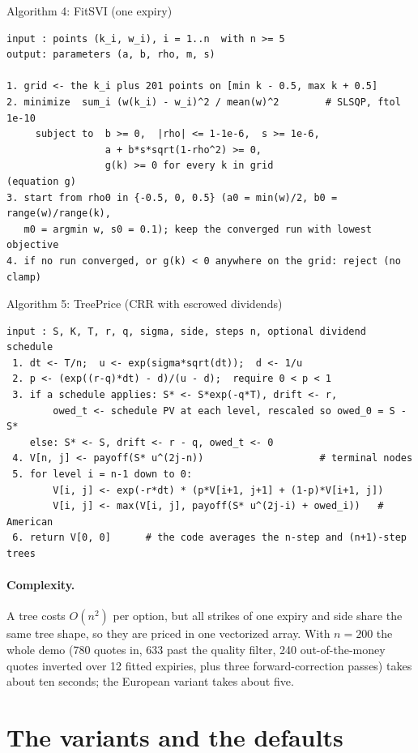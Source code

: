 \documentclass[11pt]{article}
\begin{document}
\begin{algobox}{Algorithm 4: FitSVI (one expiry)}
\begin{verbatim}
input : points (k_i, w_i), i = 1..n  with n >= 5
output: parameters (a, b, rho, m, s)

1. grid <- the k_i plus 201 points on [min k - 0.5, max k + 0.5]
2. minimize  sum_i (w(k_i) - w_i)^2 / mean(w)^2        # SLSQP, ftol 1e-10
     subject to  b >= 0,  |rho| <= 1-1e-6,  s >= 1e-6,
                 a + b*s*sqrt(1-rho^2) >= 0,
                 g(k) >= 0 for every k in grid                (equation g)
3. start from rho0 in {-0.5, 0, 0.5} (a0 = min(w)/2, b0 = range(w)/range(k),
   m0 = argmin w, s0 = 0.1); keep the converged run with lowest objective
4. if no run converged, or g(k) < 0 anywhere on the grid: reject (no clamp)
\end{verbatim}
\end{algobox}

\begin{algobox}{Algorithm 5: TreePrice (CRR with escrowed dividends)}
\begin{verbatim}
input : S, K, T, r, q, sigma, side, steps n, optional dividend schedule
 1. dt <- T/n;  u <- exp(sigma*sqrt(dt));  d <- 1/u
 2. p <- (exp((r-q)*dt) - d)/(u - d);  require 0 < p < 1
 3. if a schedule applies: S* <- S*exp(-q*T), drift <- r,
        owed_t <- schedule PV at each level, rescaled so owed_0 = S - S*
    else: S* <- S, drift <- r - q, owed_t <- 0
 4. V[n, j] <- payoff(S* u^(2j-n))                    # terminal nodes
 5. for level i = n-1 down to 0:
        V[i, j] <- exp(-r*dt) * (p*V[i+1, j+1] + (1-p)*V[i+1, j])
        V[i, j] <- max(V[i, j], payoff(S* u^(2j-i) + owed_i))   # American
 6. return V[0, 0]      # the code averages the n-step and (n+1)-step trees
\end{verbatim}
\end{algobox}

\paragraph{Complexity.} A tree costs $O(n^2)$ per option, but all strikes of one
expiry and side share the same tree shape, so they are priced in one vectorized
array. With $n=200$ the whole demo (780 quotes in, 633 past the quality
filter, 240 out-of-the-money quotes inverted over 12 fitted expiries, plus three
forward-correction passes) takes about ten seconds; the European variant takes
about five.

\section{The variants and the defaults}\label{sec:choice}
\end{document}
